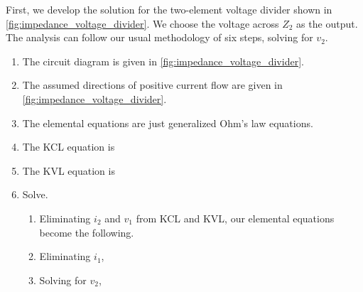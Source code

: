 \documentclass[electronics.tex]{subfiles}
\begin{document}
First, we develop the solution for the two-element voltage divider shown in \autoref{fig:impedance_voltage_divider}.
We choose the voltage across $Z_2$ as the output. 
The analysis can follow our usual methodology of six steps, solving for $v_{2}$.
\tags{}
\begin{enumerate}
	\item The circuit diagram is given in \autoref{fig:impedance_voltage_divider}.
	\item The assumed directions of positive current flow are given in \autoref{fig:impedance_voltage_divider}.
	\item The elemental equations are just generalized Ohm's law equations.%
	\item The KCL equation is 
	\item The KVL equation is 
	\item Solve.
	\begin{enumerate}
		\item Eliminating $i_2$ and $v_1$ from KCL and KVL, our elemental equations become the following.%
		\item Eliminating $i_1$,
		\item Solving for $v_2$,
	\end{enumerate}
\end{enumerate}
\end{document}
